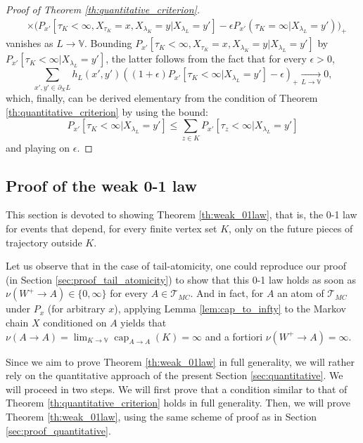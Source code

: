 \documentclass[12pt,a4paper]{article}
\newcommand{\1}[1]{{\mathbf 1}{\{#1\}}}
\newcommand{\8}{{\infty}}
\newcommand{\capa}{\mathop{\mathrm{cap}}}
\begin{document}
\begin{proof}[Proof of Theorem \ref{th:quantitative_criterion}]
\begin{equation}
\begin{aligned}
    &\times \big(  P_{x'}[\tau_K<\infty, X_{\tau_K}=x, X_{\lambda_K}=y |X_{\lambda_L}=y']  -\epsilon P_{x'}(\tau_K=\infty|X_{\lambda_L}=y') \big)_+ 
  \end{aligned}
  \end{equation}
vanishes as $L \to \mathbb{V}$. Bounding $P_{x'}[\tau_K<\infty, X_{\tau_K}=x, X_{\lambda_K}=y  |X_{\lambda_L}=y']$ by $P_{x'}[\tau_K<\infty|X_{\lambda_L}=y']$, the latter follows from the fact that for every $\epsilon>0$,
\begin{equation}
    \sum_{x',y' \in \partial_X L} h_L(x', y') \left((1+\epsilon) P_{x'}[\tau_K<\infty | X_{\lambda_L}=y']-\epsilon \right)_+ \underset{L \to \mathbb{V}}{\longrightarrow} 0,
  \end{equation}
which, finally, can be derived elementary from the condition of Theorem \ref{th:quantitative_criterion} by using the bound:
\begin{equation}
  P_{x'}[\tau_K<\infty|X_{\lambda_L}=y'] \le \sum_{z\in K}  P_{x'}[\tau_z<\infty|X_{\lambda_L}=y']
\end{equation}
and playing on $\epsilon$.
\end{proof}





\subsection{Proof of the weak 0-1 law}


This section is devoted to showing Theorem \ref{th:weak_01law}, that is, the 0-1 law for events that depend, for every finite vertex set $K$, only on the future pieces of trajectory outside $K$. 

Let us observe that in the case of tail-atomicity, one could reproduce our proof (in Section \ref{sec:proof_tail_atomicity}) to show that this 0-1 law holds as soon as $\nu(W^+ \to A)\in \{0, \infty\}$ for every $A\in \mathcal{T}_{MC}$. 
And in fact, for $A$ an atom of $\mathcal{T}_{MC}$ under $P_x$ (for arbitrary $x$), applying Lemma \ref{lem:cap_to_infty} to the Markov chain $X$ conditioned on $A$ yields that $\nu (A \to A)=\lim_{K\to\mathbb{V}} \capa_{A\to A}(K)= \infty$ and a fortiori $\nu(W^+ \to A)=\infty$. 

\smallskip

Since we aim to prove Theorem \ref{th:weak_01law} in full generality, we will rather rely on the quantitative approach of the present Section \ref{sec:quantitative}. 
We will proceed in two steps. 
We will first prove that a condition similar to that of Theorem \ref{th:quantitative_criterion} holds in full generality. Then, we will prove Theorem \ref{th:weak_01law}, using the same scheme of proof as in Section \ref{sec:proof_quantitative}.
\end{document}
